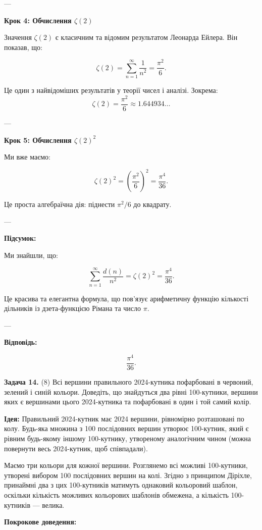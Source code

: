 \documentclass{article}
\begin{document}
---

\textbf{Крок 4: Обчислення \(\zeta(2)\)}

Значення \(\zeta(2)\) є класичним та відомим результатом Леонарда Ейлера. Він показав, що:

\[
\zeta(2) = \sum_{n=1}^{\infty} \frac{1}{n^2} = \frac{\pi^2}{6}.
\]

Це один з найвідоміших результатів у теорії чисел і аналізі. Зокрема:
\[
\zeta(2) = \frac{\pi^2}{6} \approx 1.644934\dots
\]

---

\textbf{Крок 5: Обчислення \(\zeta(2)^2\)}

Ми вже маємо:

\[
\zeta(2)^2 = \left(\frac{\pi^2}{6}\right)^2 = \frac{\pi^4}{36}.
\]

Це проста алгебраїчна дія: піднести \(\pi^2/6\) до квадрату.

---

\textbf{Підсумок:}

Ми знайшли, що:

\[
\sum_{n=1}^{\infty} \frac{d(n)}{n^2} = \zeta(2)^2 = \frac{\pi^4}{36}.
\]

Це красива та елегантна формула, що пов’язує арифметичну функцію кількості дільників із дзета-функцією Рімана та число \(\pi\).

---

\textbf{Відповідь:}

\[
\boxed{\frac{\pi^4}{36}}.
\]

\bigskip

\noindent\textbf{Задача 14.} (8) Всі вершини правильного 2024-кутника пофарбовані в червоний, зелений і синій кольори. Доведіть, що знайдуться два рівні 100-кутники, вершини яких є вершинами цього 2024-кутника та пофарбовані в один і той самий колір.

\textbf{Ідея:}  
Правильний 2024-кутник має 2024 вершини, рівномірно розташовані по колу. Будь-яка множина з 100 послідовних вершин утворює 100-кутник, який є рівним будь-якому іншому 100-кутнику, утвореному аналогічним чином (можна повернути весь 2024-кутник, щоб співпадали). 

Маємо три кольори для кожної вершини. Розглянемо всі можливі 100-кутники, утворені вибором 100 послідовних вершин на колі. Згідно з принципом Діріхле, принаймні два з цих 100-кутників матимуть однаковий кольоровий шаблон, оскільки кількість можливих кольорових шаблонів обмежена, а кількість 100-кутників — велика.

\textbf{Покрокове доведення:}
\end{document}
